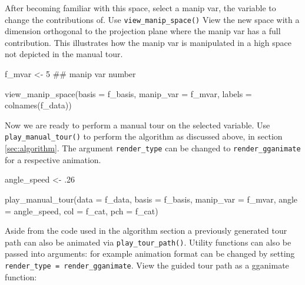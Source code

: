 \begin{Schunk}
\end{Schunk}

After becoming familiar with this space, select a manip var, the
variable to change the contributions of. Use
\texttt{view\_manip\_space()} View the new space with a dimension
orthogonal to the projection plane where the manip var has a full
contribution. This illustrates how the manip var is manipulated in a
high space not depicted in the manual tour.

\begin{Schunk}
\begin{Sinput}
f_mvar  <- 5  ## manip var number

view_manip_space(basis = f_basis, 
                 manip_var = f_mvar, 
                 labels = colnames(f_data))
\end{Sinput}
\end{Schunk}

Now we are ready to perform a manual tour on the selected variable. Use
\texttt{play\_manual\_tour()} to perform the algorithm as discussed
above, in section \ref{sec:algorithm}. The argument
\texttt{render\_type} can be changed to \texttt{render\_gganimate} for a
respective animation.

\begin{Schunk}
\begin{Sinput}
angle_speed <- .26

play_manual_tour(data = f_data,
                 basis = f_basis, 
                 manip_var = f_mvar, 
                 angle = angle_speed,
                 col = f_cat,
                 pch = f_cat)
\end{Sinput}
\end{Schunk}

Aside from the code used in the algorithm section a previously generated
tour path can also be animated via \texttt{play\_tour\_path()}. Utility
functions can also be passed into arguments: for example animation
format can be changed by setting
\texttt{render\_type\ =\ render\_gganimate}. View the guided tour path
as a gganimate function:

